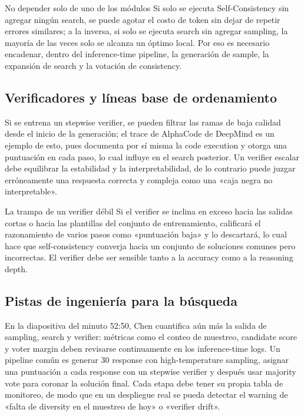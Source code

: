 \documentclass[a4paper]{article}
\begin{document}
\begin{warningbox}{No depender solo de uno de los módulos}
Si solo se ejecuta Self-Consistency sin agregar ningún search, se puede agotar el costo de token sin dejar de repetir errores similares; a la inversa, si solo se ejecuta search sin agregar sampling, la mayoría de las veces solo se alcanza un óptimo local. Por eso es necesario encadenar, dentro del inference-time pipeline, la generación de sample, la expansión de search y la votación de consistency.
\end{warningbox}

\subsection{Verificadores y líneas base de ordenamiento}
Si se entrena un stepwise verifier, se pueden filtrar las ramas de baja calidad desde el inicio de la generación; el trace de AlphaCode de DeepMind es un ejemplo de esto, pues documenta por sí misma la code execution y otorga una puntuación en cada paso, lo cual influye en el search posterior. Un verifier escalar debe equilibrar la estabilidad y la interpretabilidad, de lo contrario puede juzgar erróneamente una respuesta correcta y compleja como una «caja negra no interpretable».

\begin{warningbox}{La trampa de un verifier débil}
Si el verifier se inclina en exceso hacia las salidas cortas o hacia las plantillas del conjunto de entrenamiento, calificará el razonamiento de varios pasos como «puntuación baja» y lo descartará, lo cual hace que self-consistency converja hacia un conjunto de soluciones comunes pero incorrectas. El verifier debe ser sensible tanto a la accuracy como a la reasoning depth.
\end{warningbox}

\subsection{Pistas de ingeniería para la búsqueda}
En la diapositiva del minuto 52:50, Chen cuantifica aún más la salida de sampling, search y verifier: métricas como el conteo de muestreo, candidate score y voter margin deben revisarse continuamente en los inference-time logs. Un pipeline común es generar 30 response con high-temperature sampling, asignar una puntuación a cada response con un stepwise verifier y después usar majority vote para coronar la solución final. Cada etapa debe tener su propia tabla de monitoreo, de modo que en un despliegue real se pueda detectar el warning de «falta de diversity en el muestreo de hoy» o «verifier drift».
\end{document}
